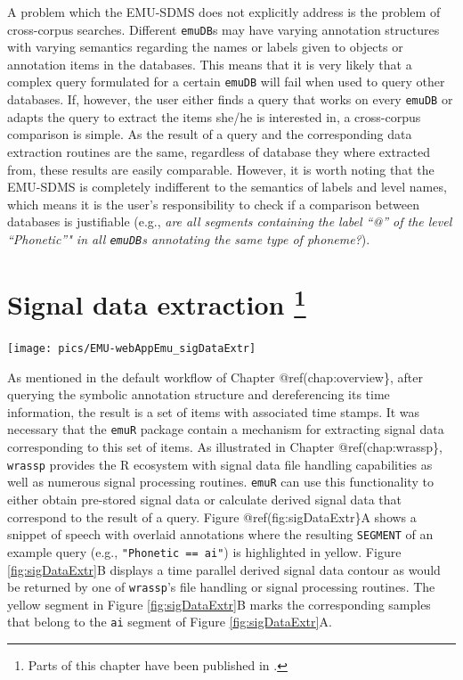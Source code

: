 \documentclass[]{book}
\let\rmarkdownfootnote\footnote%
\def\footnote{\protect\rmarkdownfootnote}
\begin{document}
A problem which the EMU-SDMS does not explicitly address is the problem of cross-corpus searches. Different \texttt{emuDB}s may have varying annotation structures with varying semantics regarding the names or labels given to objects or annotation items in the databases. This means that it is very likely that a complex query formulated for a certain \texttt{emuDB} will fail when used to query other databases. If, however, the user either finds a query that works on every \texttt{emuDB} or adapts the query to extract the items she/he is interested in, a cross-corpus comparison is simple. As the result of a query and the corresponding data extraction routines are the same, regardless of database they where extracted from, these results are easily comparable. However, it is worth noting that the EMU-SDMS is completely indifferent to the semantics of labels and level names, which means it is the user's responsibility to check if a comparison between databases is justifiable (e.g., \emph{are all segments containing the label ``@'' of the level ``Phonetic''" in all \texttt{emuDB}s annotating the same type of phoneme?}).

\hypertarget{chap:sigDataExtr}{%
\chapter[Signal data extraction ]{\texorpdfstring{Signal data extraction \footnote{Parts of this chapter have been published in \citet{winkelmann:2017aa}.}}{Signal data extraction }}\label{chap:sigDataExtr}}

\begin{center}\texttt{[image: pics/EMU-webAppEmu\_sigDataExtr]} \end{center}

As mentioned in the default workflow of Chapter @ref(chap:overview\}, after querying the symbolic annotation structure and dereferencing its time information, the result is a set of items with associated time stamps. It was necessary that the \texttt{emuR} package contain a mechanism for extracting signal data corresponding to this set of items. As illustrated in Chapter @ref(chap:wrassp\}, \texttt{wrassp} provides the R ecosystem with signal data file handling capabilities as well as numerous signal processing routines. \texttt{emuR} can use this functionality to either obtain pre-stored signal data or calculate derived signal data that correspond to the result of a query. Figure @ref(fig:sigDataExtr\}A shows a snippet of speech with overlaid annotations where the resulting \texttt{SEGMENT} of an example query (e.g., \texttt{"Phonetic\ ==\ ai"}) is highlighted in yellow. Figure \ref{fig:sigDataExtr}B displays a time parallel derived signal data contour as would be returned by one of \texttt{wrassp}'s file handling or signal processing routines. The yellow segment in Figure \ref{fig:sigDataExtr}B marks the corresponding samples that belong to the \texttt{ai} segment of Figure \ref{fig:sigDataExtr}A.
\end{document}
